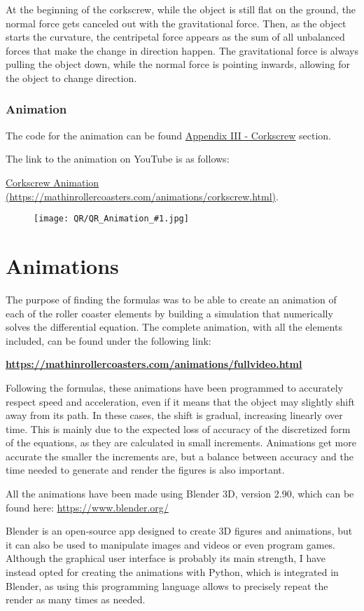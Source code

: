 \documentclass[12pt,twoside,a4paper]{article}
\newcommand{\link}[1]{https://mathinrollercoasters.com/animations/#1.html}
\newcommand{\LinkToAnimation}[2]{
\noindent The code for the animation can be found \hyperref[sec:Appendix III_#1]{Appendix III - #1} section.

\noindent The link to the animation on YouTube is as follows:
	
\noindent \href{\link{#2}}{#1 Animation (\link{#2})}.
	
\begin{figure}[H]
	\centering
	\texttt{[image: QR/QR\_Animation\_\#1.jpg]}
\end{figure}
}
\begin{document}
	At the beginning of the corkscrew, while the object is still flat on the ground, the normal force gets canceled out with the gravitational force. Then, as the object starts the curvature, the centripetal force appears as the sum of all unbalanced forces that make the change in direction happen. The gravitational force is always pulling the object down, while the normal force is pointing inwards, allowing for the object to change direction.
	
	\subsubsection{Animation}
	
	\LinkToAnimation{Corkscrew}{corkscrew}
	
	\cleardoublepage
	
	\section{Animations}
	The purpose of finding the formulas was to be able to create an animation of each of the roller coaster elements by building a simulation that numerically solves the differential equation. The complete animation, with all the elements included, can be found under the following link:
	
	{\centering \href{\link{fullvideo}}{\textbf{\link{fullvideo}}}\par}
	
	
	Following the formulas, these animations have been programmed to accurately respect speed and acceleration, even if it means that the object may slightly shift away from its path. In these cases, the shift is gradual, increasing linearly over time. This is mainly due to the expected loss of accuracy of the discretized form of the equations, as they are calculated in small increments. Animations get more accurate the smaller the increments are, but a balance between accuracy and the time needed to generate and render the figures is also important.
	
	All the animations have been made using Blender 3D, version 2.90, which can be found here: \href{https://www.blender.org/}{https://www.blender.org/}
	
	Blender is an open-source app designed to create 3D figures and animations, but it can also be used to manipulate images and videos or even program games. Although the graphical user interface is probably its main strength, I have instead opted for creating the animations with Python, which is integrated in Blender, as using this programming language allows to precisely repeat the render as many times as needed.
	
\end{document}

